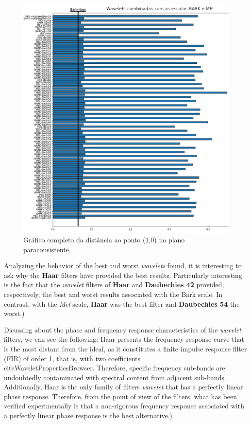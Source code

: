 \begin{figure}[h]
	\centering
	\includegraphics[width=0.99\linewidth]{images/results/paraconsistentPlane/ParaconsistentFull.png}
	\caption{Gráfico completo da distância ao ponto (1,0) no plano paraconsistente.}
	\label{fig:paraconsistentfull}
\end{figure}

\par Analyzing the behavior of the best and worst \textit{wavelets} found, it is interesting to ask why the \textbf{Haar} filters have provided the best results. Particularly interesting is the fact that the \textit{wavelet} filters of \textbf{Haar} and \textbf{Daubechies 42} provided, respectively, the best and worst results associated with the Bark scale. In contrast, with the \textit{Mel} scale, \textbf{Haar} was the best filter and \textbf{Daubechies 54} the worst.) \\

\par Dicussing about the phase and frequency response characteristics of the \textit{wavelet} filters, we can see the following: Haar presents the frequency response curve that is the most distant from the ideal, as it constitutes a finite impulse response filter (FIR) of order 1, that is, with two coefficients \\cite{WaveletPropertiesBrowser}. Therefore, specific frequency sub-bands are undoubtedly contaminated with spectral content from adjacent sub-bands. Additionally, Haar is the only family of filters \textit{wavelet} that has a perfectly linear phase response. Therefore, from the point of view of the filters, what has been verified experimentally is that a non-rigorous frequency response associated with a perfectly linear phase response is the best alternative.)
\\

